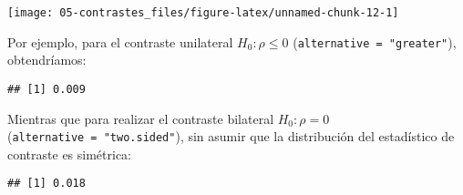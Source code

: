 \documentclass[
]{book}
\newenvironment{Shaded}{\begin{snugshade}}{\end{snugshade}}
\newcommand{\AttributeTok}[1]{\textcolor[rgb]{0.77,0.63,0.00}{#1}}
\newcommand{\ConstantTok}[1]{\textcolor[rgb]{0.00,0.00,0.00}{#1}}
\newcommand{\DecValTok}[1]{\textcolor[rgb]{0.00,0.00,0.81}{#1}}
\newcommand{\FunctionTok}[1]{\textcolor[rgb]{0.00,0.00,0.00}{#1}}
\newcommand{\NormalTok}[1]{#1}
\newcommand{\OtherTok}[1]{\textcolor[rgb]{0.56,0.35,0.01}{#1}}
\newcommand{\SpecialCharTok}[1]{\textcolor[rgb]{0.00,0.00,0.00}{#1}}
\theoremstyle{break}
\theoremstyle{definition}
\theoremstyle{definition}
\theoremstyle{definition}
\theoremstyle{definition}
\theoremstyle{remark}
\begin{document}
\begin{Shaded}
\end{Shaded}

\begin{center}\texttt{[image: 05-contrastes\_files/figure-latex/unnamed-chunk-12-1]} \end{center}

Por ejemplo, para el contraste unilateral \(H_0: \rho \leq 0\)
(\texttt{alternative\ =\ "greater"}), obtendríamos:

\begin{Shaded}
\end{Shaded}

\begin{verbatim}
## [1] 0.009
\end{verbatim}

Mientras que para realizar el contraste bilateral \(H_0: \rho = 0\)
(\texttt{alternative\ =\ "two.sided"}), sin asumir que
la distribución del estadístico de contraste es simétrica:

\begin{Shaded}
\end{Shaded}

\begin{verbatim}
## [1] 0.018
\end{verbatim}
\end{document}
